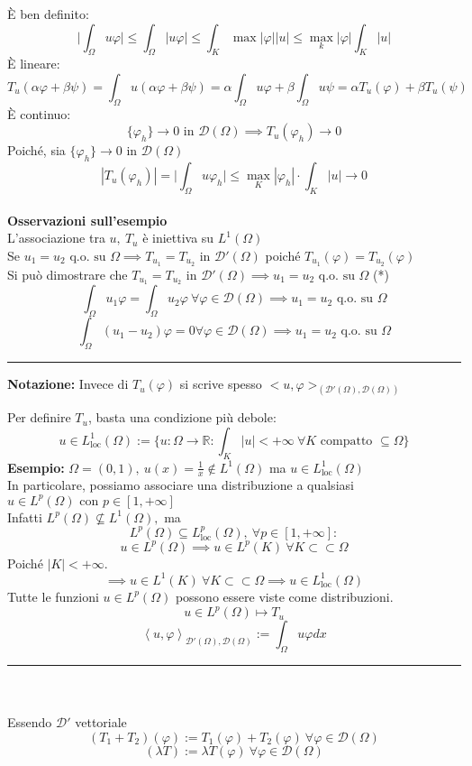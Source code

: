 \documentclass[a4paper]{article}
\newcommand{\R}{\mathbb{R}}
\newcommand{\divider}{\noindent\rule{\textwidth}{0.5pt}}
\begin{document}
È ben definito:
\[\bigg| \int_{\Omega}^{} u\varphi\bigg|\le \int_{\Omega}^{} |u\varphi|\le \int_{K}^{} \max |\varphi | |u|\le \max_k|\varphi|\int_{K}^{} |u|  \]  
È lineare:
\[T_u(\alpha\varphi+\beta\psi)=\int_{\Omega}^{} u(\alpha\varphi+\beta\psi)=\alpha \int_{\Omega}^{} u\varphi +\beta \int_{\Omega}^{}u\psi =\alpha T_u(\varphi)+\beta T_u(\psi)   \]
È continuo:
\[\{\varphi_h\} \to 0\text{ in }\mathcal D(\Omega)\implies T_u(\varphi_h)\to 0\]
Poiché, sia $\{\varphi_h\} \to 0\text{ in }\mathcal D(\Omega)$
\[|T_u(\varphi_h)|=\bigg|\int_{\Omega}^{} u\varphi_h \bigg|\le \max_K|\varphi_h|\cdot \int_{K}^{} |u|\to 0\]  
\\\textbf{Osservazioni sull'esempio} 
\\L'associazione tra $u,\ T_u$ è iniettiva su $L^{1}(\Omega)$
\\Se $u_1=u_2\text{ q.o. su }\Omega\implies T_{u_1}=T_{u_2}\text{ in }\mathcal D'(\Omega)$ poiché $T_{u_1}(\varphi)=T_{u_2}(\varphi)$
\\Si può dimostrare che $T_{u_1}=T_{u_2}\text{ in }\mathcal D'(\Omega)\implies u_1=u_2 \text{ q.o. su }\Omega$ (*)
\[\int_{\Omega}^{} u_1\varphi = \int_{\Omega}^{} u_2\varphi\ \forall \varphi\in \mathcal D(\Omega)\implies u_1=u_2\text{ q.o. su } \Omega\] 
\[\int_{\Omega}^{} (u_1-u_2)\varphi =0 \forall \varphi\in \mathcal D(\Omega)\implies u_1=u_2\text{ q.o. su } \Omega\] 
\divider
\begin{tcolorbox}
\textbf{Notazione:} Invece di $T_u(\varphi)$ si scrive spesso $<u,\varphi>_{(\mathcal D'(\Omega), \mathcal D(\Omega))}$
\end{tcolorbox}
Per definire $T_u$, basta una condizione più debole:
\[u\in L^1_{\text{loc}}(\Omega):=\{u:\Omega\to \R: \int_{K}^{} |u|<+\infty\ \forall K\text{ compatto }\subseteq  \Omega \}\]
\textbf{Esempio:} $\Omega=(0,1),\ u(x)=\frac{1}{x}\not\in L^1(\Omega)$ ma $u\in L^1_{\text{loc}}(\Omega)$
\\In particolare, possiamo associare una distribuzione a qualsiasi $u\in L^{p}(\Omega)\text{ con } p \in [1,+\infty]$ 
\\Infatti $L^{p}(\Omega)\not \subseteq  L^1(\Omega), $ ma 
\[L^{p}(\Omega)\subseteq  L^p_{\text{loc}}(\Omega),\ \forall  p \in [1,+\infty]:\]
\[u\in L^{p}(\Omega)\implies u\in L^{p}(K)\ \forall K \subset \subset \Omega\]
Poiché $|K|<+\infty$.
\[\implies u \in L^{1}(K)\ \forall K \subset  \subset \Omega \implies u\in L_{\text{loc}}^1(\Omega)\]
Tutte le funzioni $u\in L^{p}(\Omega)$ possono essere viste come distribuzioni.
\[u\in L^{p}(\Omega)\mapsto T_u\]
\[\left<u,\varphi \right>_{\mathcal D'(\Omega), \mathcal D(\Omega)}:=\int_{\Omega}^{} u\varphi dx\]
\divider\\
\\Essendo $\mathcal D'$ vettoriale
\[(T_1+T_2)(\varphi):=T_1(\varphi)+T_2(\varphi)\ \forall \varphi\in \mathcal D(\Omega)\]
\[(\lambda T):=\lambda T(\varphi) \ \forall \varphi \in \mathcal D(\Omega)\]
\end{document}
